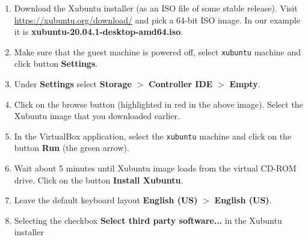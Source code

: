 \documentclass[11pt,a4paper]{article}
\begin{document}
\begin{enumerate}
\item Download the Xubuntu installer (as an ISO file of some stable release). 
Visit \url{https://xubuntu.org/download/} and pick a 64-bit ISO image.
In our example it is {\bf xubuntu-20.04.1-desktop-amd64.iso}. 
\item Make sure that the guest machine is powered off, 
select {\tt xubuntu} machine and click button {\bf Settings}. 
\item Under {\bf Settings} select {\bf Storage} $>$ {\bf Controller IDE} $>$ {\bf Empty}.\\
\item Click on the browse button (highlighted in red in the above image). Select the
Xubuntu image that you downloaded earlier.\\
\item In the VirtualBox application, select the {\tt xubuntu} machine
and click on the button {\bf Run} (the green arrow).
\item Wait about 5 minutes until Xubuntu image loads from the virtual CD-ROM drive.
Click on the button {\bf Install Xubuntu}.\\
\item Leave the default keyboard layout {\bf English (US)} $>$ {\bf English (US)}.
\item Selecting the checkbox {\bf Select third party software...} in the Xubuntu installer

\end{enumerate}
\end{document}

